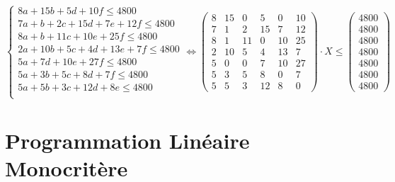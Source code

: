 \documentclass[a4paper, 11pt]{article}
\begin{document}
$$
\left\{\begin{split}
	8a+15b+5d+10f \leq 4800 \\
    7a+b+2c+15d+7e+12f \leq 4800 \\
    8a+b+11c+10e+25f \leq 4800 \\
    2a+10b+5c+4d+13e+7f \leq 4800 \\
    5a+7d+10e+27f \leq 4800 \\
	5a+3b+5c+8d+7f \leq 4800\\
	5a+5b+3c+12d+8e \leq 4800\\
\end{split}\right. \Leftrightarrow \begin{pmatrix}
        8&15&0&5&0&10 \\
        7&1&2&15&7&12\\
        8&1&11&0&10&25\\
        2&10&5&4&13&7\\
        5&0&0&7&10&27\\
        5&3&5&8&0&7\\
        5&5&3&12&8&0
    \end{pmatrix} \cdot X \leq \begin{pmatrix}
        4800\\
        4800\\
        4800\\
        4800\\
        4800\\
        4800\\
        4800
    \end{pmatrix}
$$ 

\section{Programmation Linéaire Monocritère}
\end{document}
